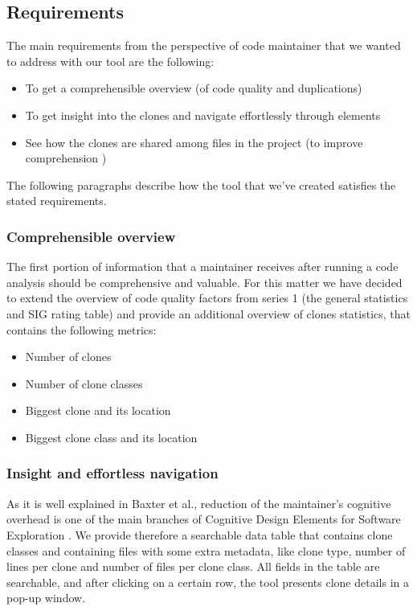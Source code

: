 \documentclass{uva-inf-article}
\begin{document}
\subsection{Requirements}
The main requirements from the perspective of code maintainer that we wanted to address with our tool are the following: 

\begin{itemize}
    \item{To get a comprehensible overview (of code quality and duplications)}
    \item{To get insight into the clones and navigate effortlessly through elements}
    \item{See how the clones are shared among files in the project (to improve comprehension ) }
\end{itemize}

The following paragraphs describe how the tool that we've created satisfies the stated requirements. 

\subsubsection{Comprehensible overview}
The first portion of information that a maintainer receives after running a code analysis should be comprehensive and valuable. For this matter we have decided to extend the overview of code quality factors from series 1 (the general statistics and SIG rating table) and provide an additional overview of clones statistics, that contains the following metrics: 
\begin{itemize}
	\item{Number of clones}
	\item{Number of clone classes}
	\item{Biggest clone and its location}
	\item{Biggest clone class and its location}
\end{itemize}

\subsubsection{Insight and effortless navigation}
As it is well explained in Baxter et al., reduction of the maintainer's cognitive overhead is one of the main branches of Cognitive Design Elements for Software Exploration \cite{baxter1998clone}. We provide therefore a searchable data table that contains clone classes and containing files with some extra metadata, like clone type, number of lines per clone and number of files per clone class. All fields in the table are searchable, and after clicking on a certain row, the tool presents clone details in a pop-up window. 
\end{document}

